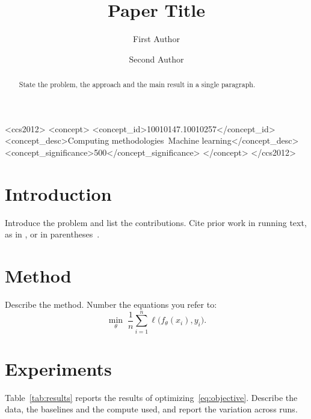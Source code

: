 \documentclass[sigconf,review,anonymous]{acmart}
\begin{document}
\title{Paper Title}

\author{First Author}

\author{Second Author}

\begin{abstract}
State the problem, the approach and the main result in a single
paragraph.
\end{abstract}

\begin{CCSXML}
<ccs2012>
  <concept>
    <concept_id>10010147.10010257</concept_id>
    <concept_desc>Computing methodologies~Machine learning</concept_desc>
    <concept_significance>500</concept_significance>
  </concept>
</ccs2012>
\end{CCSXML}



\maketitle

\section{Introduction}
Introduce the problem and list the contributions. Cite prior work in
running text, as in \citet{knuth1984texbook}, or in
parentheses~\citep{lamport1994latex}.

\section{Method}
Describe the method. Number the equations you refer to:
\begin{equation}
  \label{eq:objective}
  \min_{\theta} \; \frac{1}{n} \sum_{i=1}^{n} \ell\bigl(f_\theta(x_i), y_i\bigr) .
\end{equation}

\section{Experiments}
Table~\ref{tab:results} reports the results of
optimizing~\eqref{eq:objective}. Describe the data, the baselines and the
compute used, and report the variation across runs.
\end{document}
